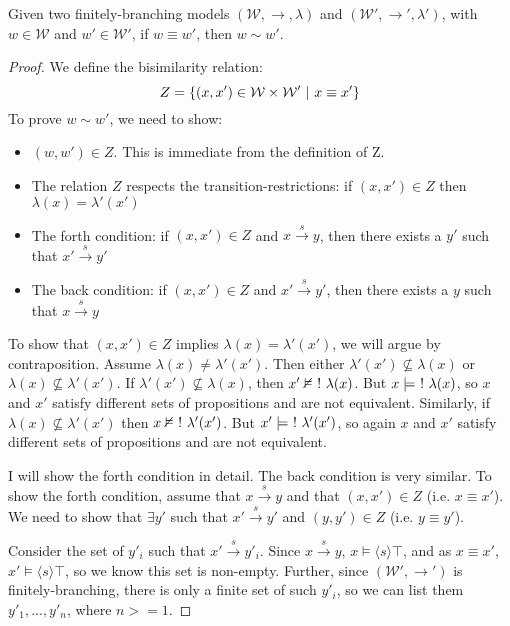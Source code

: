 \begin{case}
Given two finitely-branching models $(\mathcal{W}, \rightarrow, \lambda)$ and $(\mathcal{W}', \rightarrow', \lambda')$, with $w \in \mathcal{W}$ and $w' \in \mathcal{W}'$,
if $w \equiv w'$, then $w \sim w'$.
\end{case}
\begin{proof}
We define the bisimilarity relation:
\[
Z = \{(x,x') \in \mathcal{W} \times \mathcal{W}' \ | \  x \equiv x' \}
\]
To prove $w \sim w'$, we need to show:
\begin{itemize}
\item
$(w,w') \in Z$. This is immediate from the definition of Z.
\item
The relation $Z$ respects the transition-restrictions: if $(x,x') \in Z$ then $\lambda(x) = \lambda'(x')$
\item
The forth condition: if $(x,x') \in Z$ and $x \xrightarrow{s} y$, then there exists a $y'$ such that $x' \xrightarrow{s} y'$
\item
The back condition: if $(x,x') \in Z$ and $x' \xrightarrow{s} y'$, then there exists a $y$ such that $x \xrightarrow{s} y$
\end{itemize}
To show that $(x,x') \in Z$ implies $\lambda(x) = \lambda'(x')$, we will argue by contraposition.
Assume $\lambda(x) \neq \lambda'(x')$.
Then either $\lambda'(x') \nsubseteq  \lambda(x)$ or $\lambda(x) \nsubseteq  \lambda'(x')$.
If $\lambda'(x') \nsubseteq  \lambda(x)$, then $x' \nvDash \ ! \  \lambda(x)$.
But $x \models \ ! \  \lambda(x)$, so $x$ and $x'$ satisfy different sets of propositions and are not equivalent.
Similarly, if $\lambda(x) \nsubseteq  \lambda'(x')$ then $x \nvDash \ ! \  \lambda'(x')$.
But $x' \models \ ! \  \lambda'(x')$, so again $x$ and $x'$ satisfy different sets of propositions and are not equivalent.

I will show the forth condition in detail. The back condition is very similar.
To show the forth condition, assume that  $x \xrightarrow{s} y$ and that $(x,x') \in Z$ (i.e. $x \equiv x'$).
We need to show that $\exists y'$ such that $x' \xrightarrow{s} y'$ and $(y,y') \in Z$ (i.e. $y \equiv y'$).

Consider the set of $y'_i$ such that $x' \xrightarrow{s} y'_i$. Since $x \xrightarrow{s} y$, $x \models \langle s \rangle \top$, and as $x \equiv x'$,  $x' \models \langle s \rangle \top$, so we know this set is non-empty.
Further, since $(\mathcal{W}', \rightarrow')$ is finitely-branching, there is only a finite set of such $y'_i$, so we can list them $y'_1, ..., y'_n$,  where $n >= 1$.


\end{proof}
